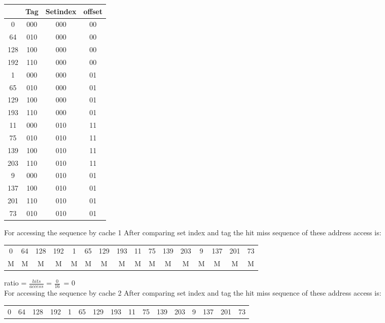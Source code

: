 \documentclass[12pt]{article}
\begin{document}
\begin{enumerate}
	\begin{center}
		\begin{tabular}{ |c|c|c|c| } 
			\hline
			& Tag & Setindex & offset \\ 
			\hline
			0&000 & 000 & 00 \\ 
			64&010&000&00\\ 
			128&100&000&00\\
			192&110&000&00\\
			1&000&000&01\\
			65&010&000&01\\
			129&100&000&01\\
			193&110&000&01\\
			11&000&010&11\\
			75&010&010&11\\
			139&100&010&11\\
			203&110&010&11\\
			9&000&010&01\\
			137&100&010&01\\
			201&110&010&01\\
			73&010&010&01\\
			\hline
		\end{tabular}
	\end{center}
	For accessing the sequence by cache 1
	After comparing set index and tag the hit miss sequence of these address access is:\\
	\begin{center}
		\begin{tabular}{ |c|c|c|c|c|c|c|c|c|c|c|c|c|c|c|c| } 
			\hline
			0&64&128&192&1&65&129&193&11&75&139&203&9&137&201&73 \\ 
			
			M&M&M&M&M&M&M&M&M&M&M&M&M&M&M&M \\  
			\hline
		\end{tabular}
	\end{center}
	ratio  =
	\(\frac{hits}{access}\) =
	\(\frac{0}{16}\)\      =
	0     \\
	For accessing the sequence by cache 2
	After comparing set index and tag the hit miss sequence of these address access is:\\
	\begin{center}
		\begin{tabular}{ |c|c|c|c|c|c|c|c|c|c|c|c|c|c|c|c| } 
			\hline
			0&64&128&192&1&65&129&193&11&75&139&203&9&137&201&73 \\ 
			

\end{tabular}
\end{center}
\end{enumerate}
\end{document}
